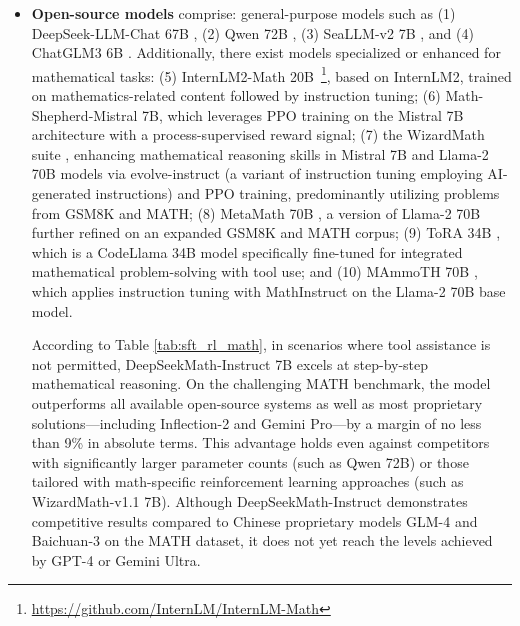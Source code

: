 \begin{itemize}[topsep=0pt]
\begin{itemize}[topsep=0pt]
    \item \textbf{Closed-source models} comprise: (1) the GPT series, notably GPT-4 \citep{gpt4} and GPT-4 Code Interpreter~\footnote{\url{https://openai.com/blog/chatgpt-plugins\#\#code-interpreter}}, which are currently the most advanced, (2) Gemini Ultra and Pro \citep{gemini}, (3) Inflection-2 \citep{inflection-2}, (4) Grok-1~\footnote{\url{https://x.ai/model-card}}, along with recently introduced models from Chinese enterprises such as (5) Baichuan-3~\footnote{\url{https://www.baichuan-ai.com}}, and (6) the most recent GLM-4~\footnote{\url{https://open.bigmodel.cn/dev/api\#glm-4}} developed as part of the GLM series \citep{glm}.
\end{itemize}

These models are designed for broad applicability and typically have been subjected to various alignment methodologies.

\item \textbf{Open-source models} comprise: general-purpose models such as (1) DeepSeek-LLM-Chat 67B \citep{deepseek-llm}, (2) Qwen 72B \citep{qwen}, (3) SeaLLM-v2 7B \citep{seallm}, and (4) ChatGLM3 6B \citep{chatglm3}. Additionally, there exist models specialized or enhanced for mathematical tasks: (5) InternLM2-Math 20B~\footnote{\url{https://github.com/InternLM/InternLM-Math}}, based on InternLM2, trained on mathematics-related content followed by instruction tuning; (6) Math-Shepherd-Mistral 7B, which leverages PPO training \citep{schulman2017proximal} on the Mistral 7B architecture \citep{mistral} with a process-supervised reward signal; (7) the WizardMath suite \citep{wizardmath}, enhancing mathematical reasoning skills in Mistral 7B and Llama-2 70B \citep{llama2} models via evolve-instruct (a variant of instruction tuning employing AI-generated instructions) and PPO training, predominantly utilizing problems from GSM8K and MATH; (8) MetaMath 70B \citep{metamath}, a version of Llama-2 70B further refined on an expanded GSM8K and MATH corpus; (9) ToRA 34B \cite{tora}, which is a CodeLlama 34B model specifically fine-tuned for integrated mathematical problem-solving with tool use; and (10) MAmmoTH 70B \citep{MathInstruct}, which applies instruction tuning with MathInstruct on the Llama-2 70B base model.

According to Table \ref{tab:sft_rl_math}, in scenarios where tool assistance is not permitted, DeepSeekMath-Instruct 7B excels at step-by-step mathematical reasoning. On the challenging MATH benchmark, the model outperforms all available open-source systems as well as most proprietary solutions—including Inflection-2 and Gemini Pro—by a margin of no less than 9\% in absolute terms. This advantage holds even against competitors with significantly larger parameter counts (such as Qwen 72B) or those tailored with math-specific reinforcement learning approaches (such as WizardMath-v1.1 7B). Although DeepSeekMath-Instruct demonstrates competitive results compared to Chinese proprietary models GLM-4 and Baichuan-3 on the MATH dataset, it does not yet reach the levels achieved by GPT-4 or Gemini Ultra.


\end{itemize}
